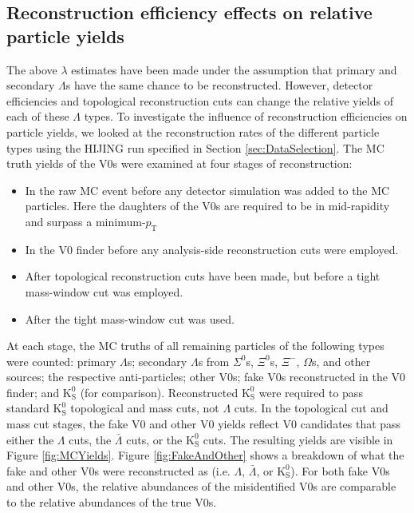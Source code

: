 \subsection{Reconstruction efficiency effects on relative particle yields}
\label{sec:ReconstructionEff}

The above $\lambda$ estimates have been made under the assumption that primary and secondary $\Lambda$s have the same chance to be reconstructed.  However, detector efficiencies and topological reconstruction cuts can change the relative yields of each of these $\Lambda$ types.  To investigate the influence of reconstruction efficiencies on particle yields, we looked at the reconstruction rates of the different particle types using the HIJING run specified in Section \ref{sec:DataSelection}.  The MC truth yields of the V0s were examined at four stages of reconstruction:
\begin{itemize}
\item In the raw MC event before any detector simulation was added to the MC particles.  Here the daughters of the V0s are required to be in mid-rapidity and surpass a minimum-$p_\mathrm{T}$
\item In the V0 finder before any analysis-side reconstruction cuts were employed.
\item After topological reconstruction cuts have been made, but before a tight mass-window cut was employed.
\item After the tight mass-window cut was used.
\end{itemize}
At each stage, the MC truths of all remaining particles of the following types were counted: primary $\Lambda$s; secondary $\Lambda$s from $\Sigma^0$s, $\Xi^0$s, $\Xi^-$, $\Omega$s, and other sources; the respective anti-particles; other V0s; fake V0s reconstructed in the V0 finder; and $\mathrm{K}^0_{\mathrm{S}}$ (for comparison).  Reconstructed $\mathrm{K}^0_{\mathrm{S}}$ were required to pass standard $\mathrm{K}^0_{\mathrm{S}}$ topological and mass cuts, not $\Lambda$ cuts.  In the topological cut and mass cut stages, the fake V0 and other V0 yields reflect V0 candidates that pass either the $\Lambda$ cuts, the $\bar{\Lambda}$ cuts, or the $\mathrm{K}^0_{\mathrm{S}}$ cuts.  The resulting yields are visible in Figure \ref{fig:MCYields}.  Figure \ref{fig:FakeAndOther} shows a breakdown of what the fake and other V0s were reconstructed as (i.e. $\Lambda$, $\bar{\Lambda}$, or $\mathrm{K}^0_{\mathrm{S}}$).  For both fake V0s and other V0s, the relative abundances of the misidentified V0s are comparable to the relative abundances of the true V0s.

